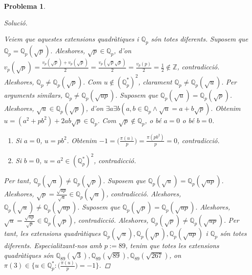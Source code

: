 \documentclass[compress]{article}
\newtheorem{problema}{Problema}
\theoremstyle{definition}
\begin{document}
\begin{problema}
\begin{proof}[Solució]
\begin{enumerate}
        \end{enumerate}
        Veiem que aquestes extensions quadràtiques i $\mathbb{Q}_{p}$ són totes diferents. Suposem que $\mathbb{Q}_{p}=\mathbb{Q}_{p}(\sqrt{p})$. Aleshores, $\sqrt{p}\in\mathbb{Q}_{p}$, d'on $v_{p}(\sqrt{p})=\frac{v_{p}(\sqrt{p})+v_{p}(\sqrt{p})}{2}=\frac{v_{p}(\sqrt{p}\sqrt{p})}{2}=\frac{v_{p}(p)}{2}=\frac{1}{2}\notin\mathbb{Z}$, contradicció. Aleshores, $\mathbb{Q}_{p}\neq\mathbb{Q}_{p}(\sqrt{p})$. Com $u\notin(\mathbb{Q}_{p}^{*})^{2}$, clarament $\mathbb{Q}_{p}\neq\mathbb{Q}_{p}(\sqrt{u})$. Per arguments similars, $\mathbb{Q}_{p}\neq\mathbb{Q}_{p}(\sqrt{up})$.\newline
        Suposem que $\mathbb{Q}_{p}(\sqrt{u})=\mathbb{Q}_{p}(\sqrt{p})$. Aleshores, $\sqrt{u}\in\mathbb{Q}_{p}(\sqrt{p})$, d'on $\exists a\exists b(a,b\in\mathbb{Q}_{p}\land\sqrt{u}=a+b\sqrt{p})$. Obtenim $u=(a^{2}+pb^{2})+2ab\sqrt{p}\in\mathbb{Q}_{p}$. Com $\sqrt{p}\notin\mathbb{Q}_{p}$, o bé $a=0$ o bé $b=0$.
        \begin{enumerate}
            \item Si $a=0$, $u=pb^{2}$. Obtenim $-1=\big(\frac{\pi(u)}{p}\big)=\frac{\pi(pb^{2})}{p}=0$, contradicció.
            \item Si $b=0$, $u=a^{2}\in(\mathbb{Q}_{p}^{*})^{2}$, contradicció.
        \end{enumerate}
        Per tant, $\mathbb{Q}_{p}(\sqrt{u})\neq\mathbb{Q}_{p}(\sqrt{p})$. Suposem que $\mathbb{Q}_{p}(\sqrt{u})=\mathbb{Q}_{p}(\sqrt{up})$. Aleshores, $\sqrt{p}=\frac{\sqrt{up}}{\sqrt{u}}\in\mathbb{Q}_{p}(\sqrt{u})$, contradicció. Aleshores, $\mathbb{Q}_{p}(\sqrt{u})\neq\mathbb{Q}_{p}(\sqrt{up})$. Suposem que $\mathbb{Q}_{p}(\sqrt{p})=\mathbb{Q}_{p}(\sqrt{up})$. Aleshores, $\sqrt{u}=\frac{\sqrt{up}}{\sqrt{p}}\in\mathbb{Q}_{p}(\sqrt{p})$, contradicció. Aleshores, $\mathbb{Q}_{p}(\sqrt{p})\neq\mathbb{Q}_{p}(\sqrt{up})$. Per tant, les extensions quadràtiques $\mathbb{Q}_{p}(\sqrt{u}),\mathbb{Q}_{p}(\sqrt{p}),\mathbb{Q}_{p}(\sqrt{up})$ i $\mathbb{Q}_{p}$ són totes diferents. Especialitzant-nos amb $p:=89$, tenim que totes les extensions quadràtiques són $\mathbb{Q}_{89}(\sqrt{3}),\mathbb{Q}_{89}(\sqrt{89}),\mathbb{Q}_{89}(\sqrt{267})$, on $\pi(3)\in\{u\in\mathbb{Q}_{p}^{*}:\big(\frac{\pi(u)}{p}\big)=-1\}$.
    \end{proof}
\end{problema}
\end{document}
